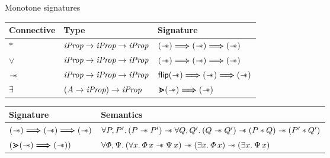 \documentclass[aspectratio=169]{beamer}
\begin{document}
\begin{frame}{Monotone signatures}
    \begin{table}
        \begin{tabular}{lll}
            Connective & Type                           & Signature                                           \\
            \hline
            $*$        & $\textit{iProp} \to \textit{iProp} \to \textit{iProp}$    & $(\mathrel{-\!\!\ast}) \mathrel{\bm{\Longrightarrow}} (\mathrel{-\!\!\ast}) \mathrel{\bm{\Longrightarrow}} (\mathrel{-\!\!\ast})$      \\
            $\lor$     & $\textit{iProp} \to \textit{iProp} \to \textit{iProp}$    & $(\mathrel{-\!\!\ast}) \mathrel{\bm{\Longrightarrow}} (\mathrel{-\!\!\ast}) \mathrel{\bm{\Longrightarrow}} (\mathrel{-\!\!\ast})$      \\
            $\mathrel{-\!\!\ast}$    & $\textit{iProp} \to \textit{iProp} \to \textit{iProp}$    & $\textsf{\upshape flip}(\mathrel{-\!\!\ast}) \mathrel{\bm{\Longrightarrow}} (\mathrel{-\!\!\ast}) \mathrel{\bm{\Longrightarrow}} (\mathrel{-\!\!\ast})$ \\
            $\exists$  & $(A \to \textit{iProp}) \to \textit{iProp}$ & $\bm{\gtrdot}(\mathrel{-\!\!\ast}) \mathrel{\bm{\Longrightarrow}} (\mathrel{-\!\!\ast})$
        \end{tabular}
    \end{table}

    \begin{table}
        \begin{tabular}{ll}
            Signature                                       & Semantics                                                                                                                                     \\
            \hline
            $(\mathrel{-\!\!\ast}) \mathrel{\bm{\Longrightarrow}} (\mathrel{-\!\!\ast}) \mathrel{\bm{\Longrightarrow}} (\mathrel{-\!\!\ast})$  & $\All \prop, \prop'. (\prop \wand \prop') \wand \All \propB, \propB'. (\propB \wand \propB') \wand (\prop * \propB) \wand (\prop' * \propB')$ \\
            $\left(\bm{\gtrdot}(\mathrel{-\!\!\ast}) \mathrel{\bm{\Longrightarrow}} (\mathrel{-\!\!\ast})\right)$ & $\All \pred, \predB. (\All \var. \pred\, \var \wand \predB\, \var) \wand (\Exists \var. \pred\, \var) \wand (\Exists \var. \predB\, \var)$
        \end{tabular}
    \end{table}
\end{frame}
\end{document}
